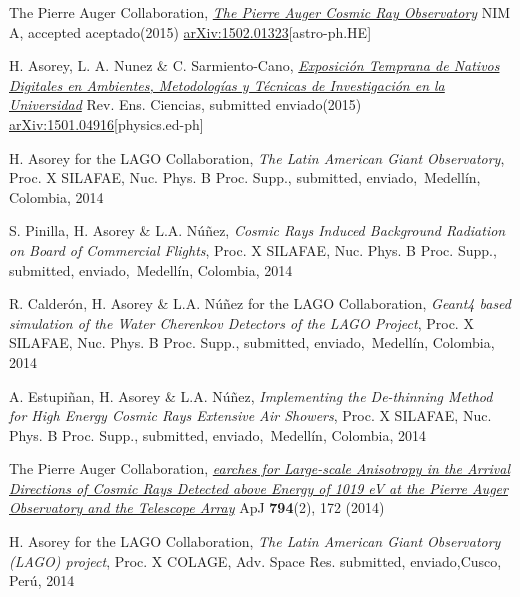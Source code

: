 \noindent
\begin{etaremune}

\item {}The Pierre Auger Collaboration, \href{http://dx.doi.org/}{\emph{The Pierre Auger Cosmic Ray Observatory}} NIM A, \ifeng accepted \else aceptado\fi (2015) \href{http://arxiv.org/abs/1502.01323}{arXiv:1502.01323}[astro-ph.HE]

\item {} H. Asorey, L. A. Nunez \& C. Sarmiento-Cano, \href{http://dx.doi.org/}{\emph{Exposición Temprana de Nativos Digitales en Ambientes, Metodologías y Técnicas de Investigación en la Universidad}} Rev. Ens. Ciencias, \ifeng submitted \else enviado\fi (2015) \href{http://arxiv.org/abs/1501.04916}{arXiv:1501.04916}[physics.ed-ph]

\item {}H. Asorey for the LAGO Collaboration, {\emph{The Latin American Giant Observatory}}, \en Proc. X SILAFAE, Nuc. Phys. B Proc. Supp., \ifeng submitted, \else enviado,\fi\ Medellín, Colombia, 2014

\item {}S. Pinilla, H. Asorey \& L.A. Núñez, {\emph{Cosmic Rays Induced Background Radiation on Board of Commercial Flights}}, \en Proc. X SILAFAE, Nuc. Phys. B Proc. Supp., \ifeng submitted, \else enviado,\fi\ Medellín, Colombia, 2014

\item {}R. Calderón, H. Asorey \& L.A. Núñez for the LAGO Collaboration, {\emph{Geant4 based simulation of the Water Cherenkov Detectors of the LAGO Project}}, \en Proc. X SILAFAE, Nuc. Phys. B Proc. Supp., \ifeng submitted, \else enviado,\fi\ Medellín, Colombia, 2014

\item {}A. Estupiñan, H. Asorey \& L.A. Núñez, {\emph{Implementing the De-thinning Method for High Energy Cosmic Rays Extensive Air Showers}}, \en Proc. X SILAFAE, Nuc. Phys. B Proc. Supp., \ifeng submitted, \else enviado,\fi\ Medellín, Colombia, 2014

\item {}The Pierre Auger Collaboration, \href{http://dx.doi.org/10.1088/0004-637X/794/2/172}{\emph{earches for Large-scale Anisotropy in the Arrival Directions of Cosmic Rays Detected above Energy of 1019 eV at the Pierre Auger Observatory and the Telescope Array}} ApJ {\bf{794}}(2), 172 (2014)

\item {}H. Asorey for the LAGO Collaboration, {\emph{The Latin American Giant Observatory (LAGO) project}}, \en Proc. X COLAGE, Adv. Space Res. \ifeng submitted, \else enviado,\fi  Cusco, Perú, 2014


\end{etaremune}
